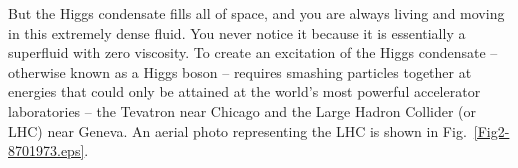 \documentclass[12pt]{iopart}
\begin{document}
But the Higgs condensate fills all of space, and you are always living and moving in this extremely dense fluid. You never notice it because it is essentially a superfluid with zero viscosity. To create an excitation of the Higgs condensate -- otherwise known as a Higgs boson -- requires smashing particles together at energies that could only be attained at the world's most powerful accelerator laboratories -- the Tevatron near Chicago and the Large Hadron Collider (or LHC) near Geneva. An aerial photo representing the LHC is shown in Fig.~\ref{Fig2-8701973.eps}.
\end{document}
